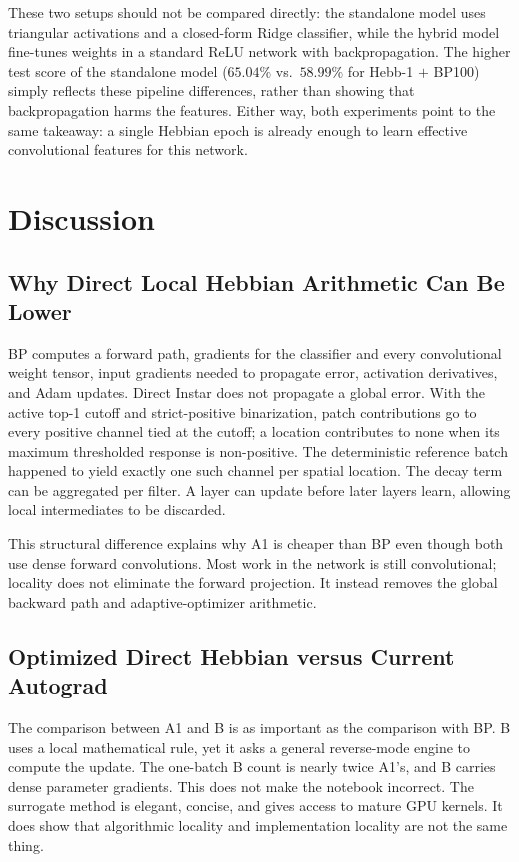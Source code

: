 \documentclass{article}
\begin{document}
{    These two setups should not be compared directly: the standalone model uses triangular activations and a closed-form Ridge classifier, while the hybrid model fine-tunes weights in a standard ReLU network with backpropagation. The higher test score of the standalone model ($65.04\%$ vs.\ $58.99\%$ for Hebb-1 $+$ BP100) simply reflects these pipeline differences, rather than showing that backpropagation harms the features. Either way, both experiments point to the same takeaway: a single Hebbian epoch is already enough to learn effective convolutional features for this network.
    }

    \section{Discussion}
    
    \subsection{Why Direct Local Hebbian Arithmetic Can Be Lower}
    
    BP computes a forward path, gradients for the classifier and every convolutional weight tensor, input gradients needed to propagate error, activation derivatives, and Adam updates. Direct Instar does not propagate a global error. With the active top-1 cutoff and strict-positive binarization, patch contributions go to every positive channel tied at the cutoff; a location contributes to none when its maximum thresholded response is non-positive. The deterministic reference batch happened to yield exactly one such channel per spatial location. The decay term can be aggregated per filter. A layer can update before later layers learn, allowing local intermediates to be discarded.
    
    This structural difference explains why A1 is cheaper than BP even though both use dense forward convolutions. Most work in the network is still convolutional; locality does not eliminate the forward projection. It instead removes the global backward path and adaptive-optimizer arithmetic.
    
    \subsection{Optimized Direct Hebbian versus Current Autograd}
    
    The comparison between A1 and B is as important as the comparison with BP. B uses a local mathematical rule, yet it asks a general reverse-mode engine to compute the update. The one-batch B count is nearly twice A1's, and B carries dense parameter gradients. This does not make the notebook incorrect. The surrogate method is elegant, concise, and gives access to mature GPU kernels. It does show that algorithmic locality and implementation locality are not the same thing.
    
\end{document}
